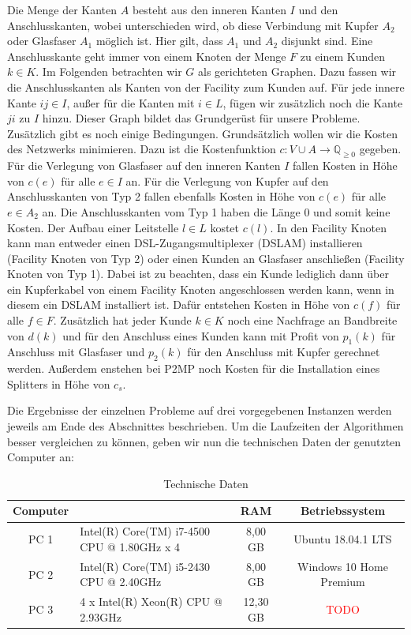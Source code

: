 \documentclass[11pt,a4paper]{article}
\newcommand{\Q}{\mathbb{Q}}
\newcommand{\TODO}{\textcolor{red}{TODO}}
\theoremstyle{my_th_style1}
\begin{document}
Die Menge der Kanten $A$ besteht aus den inneren Kanten $I$ und den Anschlusskanten, wobei unterschieden wird, ob diese Verbindung mit Kupfer $A_2$ oder Glasfaser $A_1$ möglich ist.
Hier gilt, dass $A_1$ und $A_2$ disjunkt sind.
Eine Anschlusskante geht immer von einem Knoten der Menge $F$ zu einem Kunden $k \in K$. 
Im Folgenden betrachten wir $G$ als gerichteten Graphen.
Dazu fassen wir die Anschlusskanten als Kanten von der Facility zum Kunden auf.
Für jede innere Kante $ij \in I$, außer für die Kanten mit $i \in L$, fügen wir zusätzlich noch die Kante $ji$ zu $I$ hinzu.
Dieser Graph bildet das Grundgerüst für unsere Probleme.
Zusätzlich gibt es noch einige Bedingungen.
Grundsätzlich wollen wir die Kosten des Netzwerks minimieren. 
Dazu ist die Kostenfunktion $c: V \cup A \rightarrow \Q_{\geq 0}$ gegeben.
Für die Verlegung von Glasfaser auf den inneren Kanten $I$ fallen Kosten in Höhe von $c(e)$ für alle $e \in I$ an. 
Für die Verlegung von Kupfer auf den Anschlusskanten von Typ 2 fallen ebenfalls Kosten in Höhe von $c(e)$ für alle $e \in A_2$ an. 
Die  Anschlusskanten vom Typ 1 haben die Länge 0 und somit keine Kosten.
Der Aufbau einer Leitstelle $ l\in L$ kostet $c(l)$. 
In den Facility Knoten kann man entweder einen DSL-Zugangsmultiplexer (DSLAM) installieren (Facility Knoten von Typ 2) oder einen Kunden an Glasfaser anschließen (Facility Knoten von Typ 1).
Dabei ist zu beachten, dass ein Kunde lediglich dann \"uber ein Kupferkabel von einem Facility Knoten angeschlossen werden kann, wenn in diesem ein DSLAM installiert ist.
Dafür entstehen Kosten in Höhe von $c(f)$ für alle $f \in F$.
Zusätzlich hat jeder Kunde \(k \in K\) noch eine Nachfrage an Bandbreite von $d(k)$ und für den Anschluss eines Kunden kann mit Profit von $p_1(k)$ für Anschluss mit Glasfaser und $p_2(k)$ für den Anschluss mit Kupfer gerechnet werden.
Außerdem enstehen bei P2MP noch Kosten für die Installation eines Splitters in H\"ohe von $c_s$.

Die Ergebnisse der einzelnen Probleme auf drei vorgegebenen Instanzen werden jeweils am Ende des Abschnittes beschrieben.
Um die Laufzeiten der Algorithmen besser vergleichen zu können, geben wir nun die technischen Daten der genutzten Computer an:
\begin{table}[h]
	\centering
	\begin{tabular}{|c|p{5.5cm}|c|c|}
		\hline
		Computer & \centering{Prozessor} & RAM & Betriebssystem \\	
		\hline
		PC 1 &Intel(R) Core(TM) i7-4500 CPU @ 1.80GHz x 4 & 8,00 GB & Ubuntu 18.04.1 LTS\\
		PC 2 & Intel(R) Core(TM) i5-2430 CPU @ 2.40GHz & 8,00 GB & Windows 10 Home Premium\\
		PC 3 & 4 x Intel(R) Xeon(R) CPU @ 2.93GHz  & 12,30 GB & \TODO\\
		\hline 
	\end{tabular}
	\caption{Technische Daten} 
\end{table}
\end{document}
